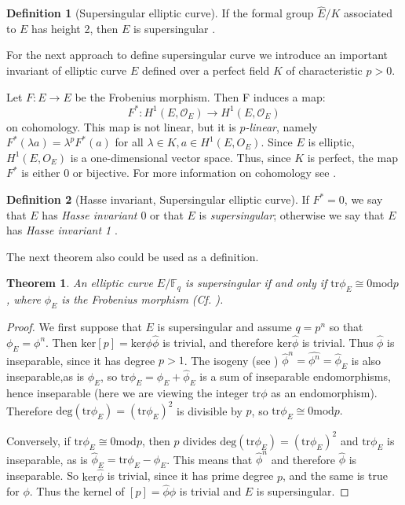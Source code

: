 \documentclass{article}
\theoremstyle{theorem}
\newtheorem{theorem}{Theorem}
\theoremstyle{definition}
\newtheorem{definition}{Definition}
\begin{document}
	\begin{definition}[Supersingular elliptic curve]
		If the formal group $\hat{E}/K$ associated to $E$ has height 2, then $E$ is supersingular \cite[V, \S3, Theorem 3.1]{Silverman}. 
	\end{definition}

For the next approach to define supersingular curve we introduce an important invariant of elliptic curve $E$ defined over a perfect field $K$ of characteristic $p > 0$.

Let $F: E \to E$ be the Frobenius morphism. Then F induces a map:
	\[ F^{\ast}: H^1(E, \mathcal{O}_E) \to H^1(E, \mathcal{O}_E)  \]
on cohomology. This map is not linear, but it is \textit{$p$-linear}, namely $F^{\ast}(\lambda a) = \lambda^pF^{\ast}(a)$ for all $\lambda \in K, a \in H^1(E, O_E)$. Since $E$ is elliptic, $H^1(E, O_E)$ is a one-dimensional vector space. Thus, since $K$ is perfect, the map $F^{\ast}$ is either 0 or bijective.
For more information on cohomology see \cite[III]{Hartshorne}.
	\begin{definition}[Hasse invariant, Supersingular elliptic curve]
		If $F^{\ast} = 0$, we say that $E$ has \textit{Hasse invariant $0$} or that $E$ is \textit{supersingular}; otherwise we say that $E$ has \textit{Hasse invariant 1} \cite[IV, 4]{Hartshorne}.
	\end{definition}

The next theorem also could be used as a definition.
	\begin{theorem} 
		An elliptic curve $E/\mathbb{F}_q$ is supersingular if and only if $\mathrm{tr}\phi_E \cong 0 \mathrm{mod} p$, where $\phi_E$ is the Frobenius morphism (Cf. \cite[Lecture 14]{SutherlandEllipticCurves}).
	\end{theorem}
		\begin{proof}
			We first suppose that $E$ is supersingular and assume $q = p^n$ so that $\phi_E = \phi^n$. Then $\mathrm{ker}[p] = \mathrm{ker}\phi\hat{\phi}$ is trivial, and therefore $\mathrm{ker}\hat{\phi}$ is trivial. Thus $\hat{\phi}$ is inseparable, since it has degree $p > 1$. The isogeny (see \pageref{isogeny}) $\hat{\phi}^n = \hat{\phi^n} = \hat{\phi}_E$ is also inseparable,as is $\phi_E$, so $\mathrm{tr}\phi_E = \phi_E + \hat{\phi}_E$ is a sum of inseparable endomorphisms, hence inseparable (here we are viewing the integer $\mathrm{tr}\phi$ as an endomorphism). Therefore $\mathrm{deg}(\mathrm{tr}\phi_E) = (\mathrm{tr}\phi_E)^2$ is divisible by $p$, so $\mathrm{tr}\phi_E \cong 0 \mathrm{mod} p.$
			
			Conversely, if $\mathrm{tr}\phi_E \cong 0 \mathrm{mod} p$, then $p$ divides $\mathrm{deg}(\mathrm{tr}\phi_E) = (\mathrm{tr}\phi_E)^2$ and $\mathrm{tr}\phi_E$ is inseparable, as is $\hat{\phi}_E = \mathrm{tr}\phi_E - \phi_E$. This means that $\hat{\phi}^n$ and therefore $\hat{\phi}$ is inseparable. So $\mathrm{ker}\hat{\phi}$ is trivial, since it has prime degree $p$, and the same is true for $\phi$. Thus the kernel of $[p] = \hat{\phi}\phi$ is trivial and $E$ is supersingular.
		\end{proof}
		
\end{document}
